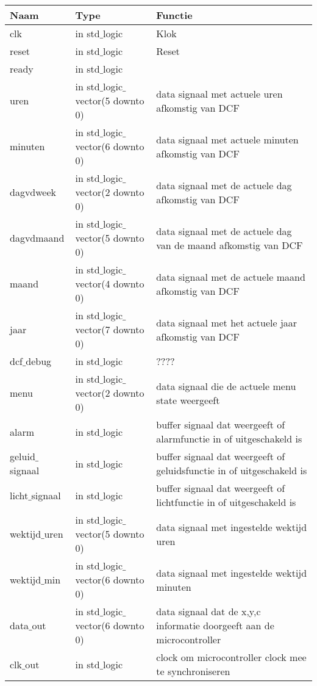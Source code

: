 \begin{center}
\label{table:uitgangen}
\begin{tabular}{| l | l | p{4.5cm} |}
\hline
\textbf{Naam} & \textbf{Type} & \textbf{Functie} \\ \hline
clk           				& in std$\_$logic           									& Klok             \\ \hline
reset         			& in std$\_$logic           									& Reset            \\ \hline
ready					& in std$\_$logic 											&  \\ \hline
uren						&in std$\_$logic$\_$vector(5 downto 0) 		&data signaal met actuele uren afkomstig van DCF \\ \hline
minuten				&in std$\_$logic$\_$vector(6 downto 0) 		&data signaal met actuele minuten afkomstig van DCF \\ \hline
dagvdweek			&in std$\_$logic$\_$vector(2 downto 0)			&data signaal met de actuele dag afkomstig van DCF\\ \hline
dagvdmaand		&in std$\_$logic$\_$vector(5 downto 0) 		&data signaal met de actuele dag van de maand afkomstig van DCF \\ \hline
maand					&in std$\_$logic$\_$vector(4 downto 0) 		&data signaal met de actuele maand afkomstig van DCF  \\ \hline
jaar						&in std$\_$logic$\_$vector(7 downto 0)	 		&data signaal met het actuele jaar afkomstig van DCF  \\ \hline
dcf$\_$debug		&in std$\_$logic 												& ????  \\ \hline
menu					&in std$\_$logic$\_$vector(2 downto 0)			&data signaal die de actuele menu state weergeeft \\ \hline
alarm 					&in std$\_$logic												&buffer signaal dat weergeeft of alarmfunctie in of uitgeschakeld is\\ \hline
geluid$\_$signaal 		&in std$\_$logic 		 										&buffer signaal dat weergeeft of geluidsfunctie in of uitgeschakeld is \\ \hline
licht$\_$signaal 	&in std$\_$logic 		 										&buffer signaal dat weergeeft of lichtfunctie in of uitgeschakeld is  \\ \hline 
wektijd$\_$uren 	& in std$\_$logic$\_$vector(5 downto 0)		&data signaal met ingestelde wektijd uren \\ \hline 
wektijd$\_$min 	&in std$\_$logic$\_$vector(6 downto 0) 		&data signaal met ingestelde wektijd minuten \\ \hline 
data$\_$out 		&in std$\_$logic$\_$vector(6 downto 0) 		&data signaal dat de x,y,c informatie doorgeeft aan de microcontroller \\ \hline 
clk$\_$out 			&in std$\_$logic 		 										&clock om microcontroller clock mee te synchroniseren \\ \hline 
\end{tabular}
\end{center}

